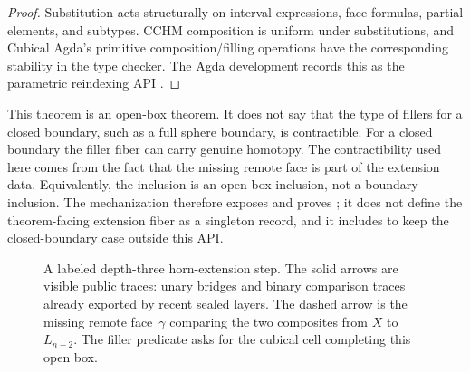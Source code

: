 \documentclass{lmcs}
\begin{document}
\begin{proof}
Substitution acts structurally on interval expressions, face formulas, partial
elements, and subtypes. CCHM composition is uniform under substitutions, and
Cubical Agda's primitive composition/filling operations have the corresponding
stability in the type checker. The Agda development records this as the
parametric reindexing API .
\end{proof}

\begin{rem}
\label{rem:open-box-not-closed-boundary}
\leavevmode\par\smallskip
\noindent{}
\par\smallskip

This theorem is an open-box theorem. It does not say that the type of fillers
for a closed boundary, such as a full sphere boundary, is contractible. For a
closed boundary the filler fiber can carry genuine homotopy. The contractibility
used here comes from the fact that the missing remote face is part of the
extension data. Equivalently, the inclusion is an open-box inclusion, not a
boundary inclusion. The mechanization therefore exposes
 and proves
; it does not define the theorem-facing extension
fiber as a singleton record, and it includes
 to keep the
closed-boundary case outside this API.
\end{rem}

\begin{figure}[t]
\centering
{}
\caption{A labeled depth-three horn-extension step. The solid arrows are visible public traces: unary bridges and binary comparison traces already exported by recent sealed layers. The dashed arrow is the missing remote face~$\gamma$ comparing the two composites from $X$ to $L_{n-2}$. The filler predicate asks for the cubical cell completing this open box.}
\label{fig:depth-three-horn}
\end{figure}
\end{document}

